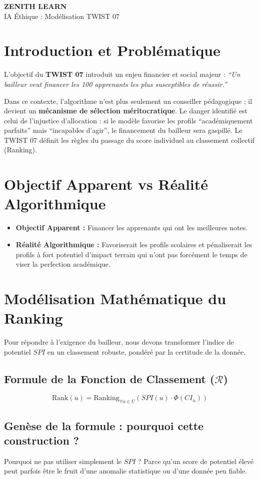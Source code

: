 \documentclass[11pt,a4paper]{article}
\newcommand{\makebrandtitle}{
    \begin{tcolorbox}[enhanced, colback=BrandDark, colframe=BrandPrimary, arc=10pt, boxrule=2pt, halign=center]
        \vspace{0.3cm}
        {\Huge \bfseries \color{white} ZENITH LEARN} \\
        \vspace{0.2cm}
        {\Large \color{BrandPrimary} IA Éthique : Modélisation TWIST 07} \\
        \vspace{0.3cm}
    \end{tcolorbox}
    \vspace{0.5cm}
}
\begin{document}
\makebrandtitle

\section{Introduction et Problématique}
L'objectif du \textbf{TWIST 07} introduit un enjeu financier et social majeur : \textit{``Un bailleur veut financer les 100 apprenants les plus susceptibles de réussir.''} 

Dans ce contexte, l'algorithme n'est plus seulement un conseiller pédagogique ; il devient un \textbf{mécanisme de sélection méritocratique}. Le danger identifié est celui de l'injustice d'allocation : si le modèle favorise les profils ``académiquement parfaits'' mais ``incapables d'agir'', le financement du bailleur sera gaspillé. Le TWIST 07 définit les règles du passage du score individuel au classement collectif (Ranking).

\section{Objectif Apparent vs Réalité Algorithmique}
\begin{itemize}
    \item \textbf{Objectif Apparent :} Financer les apprenants qui ont les meilleures notes.
    \item \textbf{Réalité Algorithmique :} Favoriserait les profils scolaires et pénaliserait les profils à fort potentiel d'impact terrain qui n'ont pas forcément le temps de viser la perfection académique.
\end{itemize}

\section{Modélisation Mathématique du Ranking}
Pour répondre à l'exigence du bailleur, nous devons transformer l'indice de potentiel $SPI$ en un classement robuste, pondéré par la certitude de la donnée.

\subsection{Formule de la Fonction de Classement ($\mathcal{R}$)}
\begin{equation}
\text{Rank}(u) = \text{Ranking}_{\forall u \in U} \left( SPI(u) \cdot \Phi(CI_u) \right)
\end{equation}

\subsection{Genèse de la formule : pourquoi cette construction ?}
Pourquoi ne pas utiliser simplement le $SPI$ ? Parce qu'un score de potentiel élevé peut parfois être le fruit d'une anomalie statistique ou d'une donnée peu fiable. 
\end{document}
